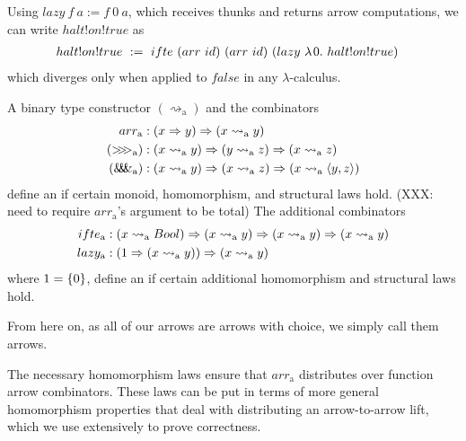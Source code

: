 \documentclass[preprint]{sigplanconf}
\newcommand{\arrow}{\rightsquigarrow}
\newcommand{\arrowarr}{\ensuremath{arr}}
\newcommand{\arrowcomp}{\ensuremath{{>}\mspace{-6mu}{>}\mspace{-6mu}{>}}}
\newcommand{\arrowpair}{\ensuremath{\mathit{\&\mspace{-7.5mu}\&\mspace{-7.5mu}\&}}}
\newcommand{\arrowif}{\ensuremath{ifte}}
\newcommand{\arrowlazy}{\ensuremath{lazy}}
\newcommand{\gen}{_\mathrm{a}}
\begin{document}
Using $\arrowlazy~f~a := f~0~a$, which receives thunks and returns arrow computations, we can write $halt!on!true$ as
\begin{equation}
\begin{aligned}
	&halt!on!true \ := \ 
	\arrowif~(\arrowarr~id)~(\arrowarr~id)~(\arrowlazy~\fun{0}{halt!on!true})
\end{aligned}
\end{equation}
which diverges only when applied to $false$ in any $\lambda$-calculus.

\begin{definition}[arrow with choice]A binary type constructor $(\arrow\gen)$ and the combinators
\begin{equation}
\begin{aligned}
	\arrowarr\gen &: (x \tto y) \tto (x \arrow\gen y)
\\
	(\arrowcomp\gen) &: (x \arrow\gen y) \tto (y \arrow\gen z) \tto (x \arrow\gen z)
\\
	(\arrowpair\gen) &: (x \arrow\gen y) \tto (x \arrow\gen z) \tto (x \arrow\gen \pair{y,z})
\end{aligned}
\label{eqn:arrow-combinators}
\end{equation}
define an  if certain monoid, homomorphism, and structural laws hold.
(XXX: need to require $\arrowarr\gen$'s argument to be total)
The additional combinators
\begin{equation}
\begin{aligned}
	\arrowif\gen &: (x \arrow\gen Bool) \tto (x \arrow\gen y) \tto (x \arrow\gen y) \tto (x \arrow\gen y)
\\
	\arrowlazy\gen &: (1 \tto (x \arrow\gen y)) \tto (x \arrow\gen y)
\end{aligned}
\end{equation}
where $1 = \{{0}\}$, define an  if certain additional homomorphism and structural laws hold.
\end{definition}

From here on, as all of our arrows are arrows with choice, we simply call them arrows.

The necessary homomorphism laws ensure that $\arrowarr\gen$ distributes over function arrow combinators.
These laws can be put in terms of more general homomorphism properties that deal with distributing an arrow-to-arrow lift, which we use extensively to prove correctness.
\end{document}
